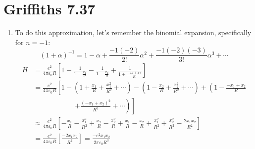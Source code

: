\documentclass[11pt]{article}
\begin{document}
\newpage

\section*{Griffiths 7.37}
\begin{enumerate}[label=\alph*)]
\item 
To do this approximation, let's remember the binomial expansion, specifically for $n=-1$:
\[(1+\alpha)^{-1} = 1 - \alpha + \frac{-1(-2)}{2!}\alpha^2 + \frac{-1(-2)(-3)}{3!}\alpha^3 + \cdots\]
\begin{align*}
H & = \frac{e^2}{4\pi\varepsilon_0 R}\left[1-\frac{1}{1-\frac{x_1}{R}} - \frac{1}{1-\frac{x_2}{R}} + \frac{1}{1+\frac{-x_1+x_2}{R}}\right]\\
& = \frac{e^2}{4\pi\varepsilon_0 R}\left[1 - \left(1 + \frac{x_1}{R} + \frac{x_1^2}{R^2} + \cdots\right) - \left(1 - \frac{x_2}{R} + \frac{x_2^2}{R^2} + \cdots \right) + \left(1 - \frac{-x_1 + x_2}{R} \right. \right. \\
& \qquad \qquad \qquad \left. \left.  + \frac{(-x_1 + x_2)^2}{R^2} + \cdots\right)\right]\\
& \approx \frac{e^2}{4\pi\varepsilon_0 R}\left[-\frac{x_1}{R} -\frac{x_1^2}{R^2} + \frac{x_2}{R} -\frac{x_2^2}{R} + \frac{x_1}{R} -\frac{x_2}{R} + \frac{x_1^2}{R^2} + \frac{x_2^2}{R^2} - \frac{2x_1x_2}{R^2}\right]\\
& = \frac{e^2}{4\pi\varepsilon_0 R}\left[\frac{-2x_1x_2}{R^2}\right] = \boxed{\frac{-e^2 x_1x_2}{2\pi\varepsilon_0 R^3}}
\end{align*}


\end{enumerate}
\end{document}
